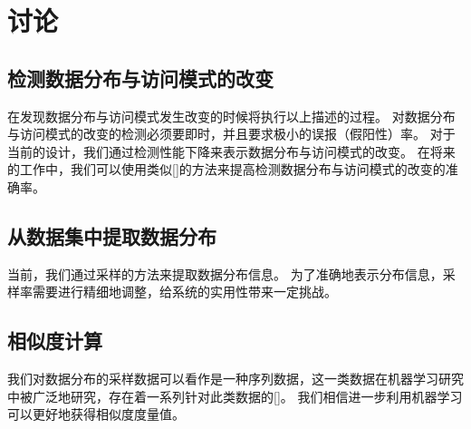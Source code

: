 \section{讨论}

\subsection{检测数据分布与访问模式的改变}

{\sys}在发现数据分布与访问模式发生改变的时候将执行以上描述的过程。
对数据分布与访问模式的改变的检测必须要即时，并且要求极小的误报（假阳性）率。
对于当前的设计，我们通过检测性能下降来表示数据分布与访问模式的改变。
在将来的工作中，我们可以使用类似[]的方法来提高检测数据分布与访问模式的改变的准确率。


\subsection{从数据集中提取数据分布}
当前，我们通过采样的方法来提取数据分布信息。
为了准确地表示分布信息，采样率需要进行精细地调整，给系统的实用性带来一定挑战。


\subsection{相似度计算}
我们对数据分布的采样数据可以看作是一种序列数据，这一类数据在机器学习研究中被广泛地研究，存在着一系列针对此类数据的{\model}[]。
我们相信进一步利用机器学习可以更好地获得相似度度量值。


